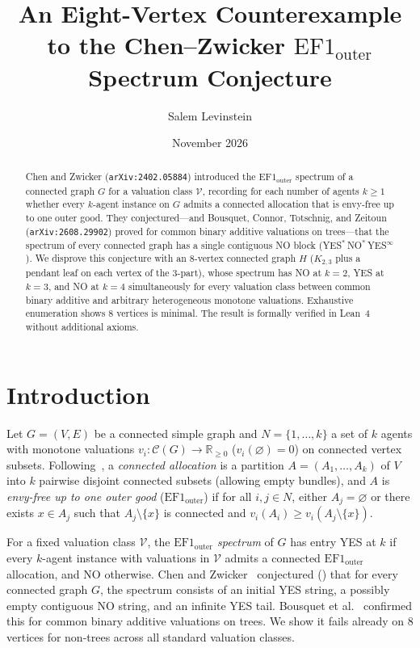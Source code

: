 \documentclass[11pt]{article}
\title{An Eight-Vertex Counterexample to the Chen--Zwicker $\mathrm{EF1}_{\mathrm{outer}}$ Spectrum Conjecture}
\author{Salem Levinstein}
\date{November 2026}
\theoremstyle{remark}
\begin{document}
\maketitle

\begin{abstract}
Chen and Zwicker (\texttt{arXiv:2402.05884}) introduced the $\mathrm{EF1}_{\mathrm{outer}}$ spectrum of a connected graph $G$ for a valuation class $\mathcal{V}$, recording for each number of agents $k \ge 1$ whether every $k$-agent instance on $G$ admits a connected allocation that is envy-free up to one outer good. They conjectured---and Bousquet, Connor, Totschnig, and Zeitoun (\texttt{arXiv:2608.29902}) proved for common binary additive valuations on trees---that the spectrum of every connected graph has a single contiguous \textup{NO} block (\textup{YES}$^*$\,\textup{NO}$^*$\,\textup{YES}$^\infty$). We disprove this conjecture with an $8$-vertex connected graph $H$ ($K_{2,3}$ plus a pendant leaf on each vertex of the $3$-part), whose spectrum has \textup{NO} at $k = 2$, \textup{YES} at $k = 3$, and \textup{NO} at $k = 4$ simultaneously for every valuation class between common binary additive and arbitrary heterogeneous monotone valuations. Exhaustive enumeration shows $8$ vertices is minimal. The result is formally verified in Lean~4 without additional axioms.
\end{abstract}

\section{Introduction}

Let $G = (V, E)$ be a connected simple graph and $N = \{1, \dots, k\}$ a set of $k$ agents with monotone valuations $v_i : \mathcal{C}(G) \to \mathbb{R}_{\ge 0}$ ($v_i(\varnothing) = 0$) on connected vertex subsets. Following~\cite[Definition~2]{BCTZ2026}, a \emph{connected allocation} is a partition $A = (A_1, \dots, A_k)$ of $V$ into $k$ pairwise disjoint connected subsets (allowing empty bundles), and $A$ is \emph{envy-free up to one outer good} ($\mathrm{EF1}_{\mathrm{outer}}$) if for all $i, j \in N$, either $A_j = \varnothing$ or there exists $x \in A_j$ such that $A_j \setminus \{x\}$ is connected and $v_i(A_i) \ge v_i(A_j \setminus \{x\})$.

For a fixed valuation class $\mathcal{V}$, the \emph{$\mathrm{EF1}_{\mathrm{outer}}$ spectrum} of $G$ has entry \textup{YES} at $k$ if every $k$-agent instance with valuations in $\mathcal{V}$ admits a connected $\mathrm{EF1}_{\mathrm{outer}}$ allocation, and \textup{NO} otherwise. Chen and Zwicker~\cite{CZ2024} conjectured (\cite[Conjecture~1]{BCTZ2026}) that for every connected graph $G$, the spectrum consists of an initial \textup{YES} string, a possibly empty contiguous \textup{NO} string, and an infinite \textup{YES} tail. Bousquet et al.~\cite[Theorem~7]{BCTZ2026} confirmed this for common binary additive valuations on trees. We show it fails already on $8$ vertices for non-trees across all standard valuation classes.
\end{document}
